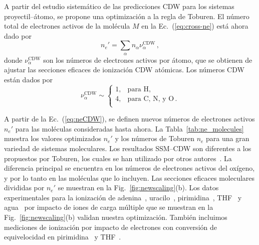 A partir del estudio sistemático de las predicciones CDW para los 
sistemas proyectil--átomo, se propone una optimización a la regla de 
Toburen. El número total de electrones activos de la molécula $M$ en la 
Ec.~(\ref{eq:cross-ne}) está ahora dado por 
\begin{equation}
n_e'=\sum_{\alpha}n_{\alpha}\nu_{\alpha}^{\text{CDW}}\,,
\label{eq:neprima}
\end{equation}
donde $\nu_{\alpha}^{\text{CDW}}$ son los números de electrones activos 
por átomo, que se obtienen de ajustar las secciones eficaces de 
ionización CDW atómicas. Los números CDW están dados por
\begin{equation}
\nu_{\alpha }^{\text{CDW}} \sim\left\{ 
\begin{array}{ll}
1, & \text{para H,} \\
4, & \text{para C, N, y O}\,. \\ 
\end{array}
\right. 
\label{eq:neCDW}
\end{equation}

A partir de la Ec.~(\ref{eq:neCDW}), se definen nuevos números de 
electrones activos $n_e'$ para las moléculas consideradas hasta ahora.  
La Tabla~\ref{tab:ne_molecules} muestra los valores optimizados $n_e'$ y 
los números de Toburen $n_e$ para una gran variedad de sistemas 
moleculares. Los resultados SSM--CDW son diferentes a los propuestos por 
Toburen, los cuales se han utilizado por otros autores~\cite{itoh2013}. 
La diferencia principal se encuentra en los números de electrones 
activos del oxígeno, y por lo tanto en las moléculas que lo incluyen. 
Las secciones eficaces moleculares divididas por $n_e'$ se muestran en 
la Fig.~\ref{fig:newscaling}(b). Los datos experimentales para la 
ionización de adenina~\cite{Iriki:11,Sens:20,Bhattacharjee:19}, 
uracilo~\cite{itoh2013,Sens:20}, pirimidina~\cite{wolff2014}, 
THF~\cite{wang2016} y agua~\cite{Luna2007,Bolorizadeh86,H_Rudd85,
toburen80,Ohsawa05,He_Rudd85,DalCappello:09,Bhattacharjee:17,
Bhattacharjee:16} por impacto de iones de carga múltiple que se muestran 
en la Fig.~\ref{fig:newscaling}(b) validan nuestra optimización. También 
incluimos mediciones de ionización por impacto de electrones con 
conversión de equivelocidad en pirimidina~\cite{bug2017} y 
THF~\cite{bug2017,wolf2019,fuss2009}. 


